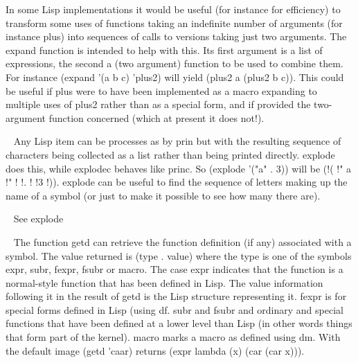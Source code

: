 \begin{description}
In some Lisp implementations it would be useful (for instance for efficiency)
to transform some uses of functions taking an indefinite number of arguments
(for instance {\tx plus}) into sequences of calls to versions taking just
two arguments. The {\tx expand} function is intended to help with this. Its
first argument is a list of expressions, the second a (two argument) function
to be used to combine them. For instance {\tx (expand '(a b c) 'plus2)} will
yield {\tx (plus2 a (plus2 b c))}. This could be useful if {\tx plus} were
to have been implemented as a macro expanding to multiple uses of {\tx plus2}
rather than as a special form, and if \vsl{} provided the two-argument
function concerned (which at present it does not!).
\item[{\tx explode~~~~~~} \hspace{1cm} {\em function 1 arg}]~\newline
Any Lisp item can be processes as by {\tx prin} but with the resulting sequence
of characters being collected as a list rather than being printed directly.
{\tx explode} does this, while {\tx explodec} behaves like {\tx princ}. So
{\tx (explode '("a" . 3))} will be {\tx (!( !" a !" !  !. !  !3 !))}.
{\tx explode} can be useful to find the sequence of letters making up the name
of a symbol (or just to make it possible to see how many there are).
\item[{\tx explodec~~~~~} \hspace{1cm} {\em function 1 arg}]~\newline
See {\tx explode}
\item[{\tx expr~~~~~~~~~} \hspace{1cm} {\em symbol}]~\newline
The function {\tx getd} can retrieve the function definition (if any) associated
with a symbol. The value returned is {\tx (type . value)} where the {\tx type}
is one of the symbols {\tx expr}, {\tx subr}, {\tx fexpr}, {\tx fsubr} or
{\tx macro}. The case {\tx expr} indicates that the function is a normal-style
function that has been defined in Lisp. The value information following it
in the result of {\tx getd} is the Lisp structure representing it. {\tx fexpr}
is for special forms defined in Lisp (using {\tx df}. {\tx subr} and {\tx fsubr}
and ordinary and special functions that have been defined at a lower level than
Lisp (in other words things that form part of the \vsl{} kernel). {\tx macro}
marks a macro as defined using {\tx dm}. With the default
\vsl{} image {\tx (getd 'caar)} returns {\tx (expr lambda (x) (car (car x)))}.

\end{description}
